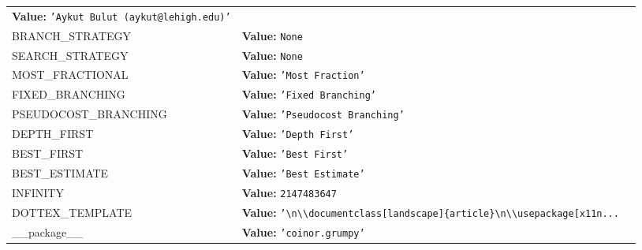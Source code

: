 \begin{longtable}{|p{\varnamewidth}|p{\vardescrwidth}|l}
\textbf{Value:} 
{\tt \texttt{'}\texttt{Aykut Bulut (aykut@lehigh.edu)}\texttt{'}}&\\
\cline{1-2}
\raggedright B\-R\-A\-N\-C\-H\-\_\-S\-T\-R\-A\-T\-E\-G\-Y\- & \raggedright \textbf{Value:} 
{\tt None}&\\
\cline{1-2}
\raggedright S\-E\-A\-R\-C\-H\-\_\-S\-T\-R\-A\-T\-E\-G\-Y\- & \raggedright \textbf{Value:} 
{\tt None}&\\
\cline{1-2}
\raggedright M\-O\-S\-T\-\_\-F\-R\-A\-C\-T\-I\-O\-N\-A\-L\- & \raggedright \textbf{Value:} 
{\tt \texttt{'}\texttt{Most Fraction}\texttt{'}}&\\
\cline{1-2}
\raggedright F\-I\-X\-E\-D\-\_\-B\-R\-A\-N\-C\-H\-I\-N\-G\- & \raggedright \textbf{Value:} 
{\tt \texttt{'}\texttt{Fixed Branching}\texttt{'}}&\\
\cline{1-2}
\raggedright P\-S\-E\-U\-D\-O\-C\-O\-S\-T\-\_\-B\-R\-A\-N\-C\-H\-I\-N\-G\- & \raggedright \textbf{Value:} 
{\tt \texttt{'}\texttt{Pseudocost Branching}\texttt{'}}&\\
\cline{1-2}
\raggedright D\-E\-P\-T\-H\-\_\-F\-I\-R\-S\-T\- & \raggedright \textbf{Value:} 
{\tt \texttt{'}\texttt{Depth First}\texttt{'}}&\\
\cline{1-2}
\raggedright B\-E\-S\-T\-\_\-F\-I\-R\-S\-T\- & \raggedright \textbf{Value:} 
{\tt \texttt{'}\texttt{Best First}\texttt{'}}&\\
\cline{1-2}
\raggedright B\-E\-S\-T\-\_\-E\-S\-T\-I\-M\-A\-T\-E\- & \raggedright \textbf{Value:} 
{\tt \texttt{'}\texttt{Best Estimate}\texttt{'}}&\\
\cline{1-2}
\raggedright I\-N\-F\-I\-N\-I\-T\-Y\- & \raggedright \textbf{Value:} 
{\tt 2147483647}&\\
\cline{1-2}
\raggedright D\-O\-T\-2\-T\-E\-X\-\_\-T\-E\-M\-P\-L\-A\-T\-E\- & \raggedright \textbf{Value:} 
{\tt \texttt{'}\texttt{{\textbackslash}n{\textbackslash}{\textbackslash}documentclass[landscape]\{article\}{\textbackslash}n{\textbackslash}{\textbackslash}usepackage[x11n}\texttt{...}}&\\
\cline{1-2}
\raggedright \_\-\_\-p\-a\-c\-k\-a\-g\-e\-\_\-\_\- & \raggedright \textbf{Value:} 
{\tt \texttt{'}\texttt{coinor.grumpy}\texttt{'}}&\\
\cline{1-2}
\end{longtable}



